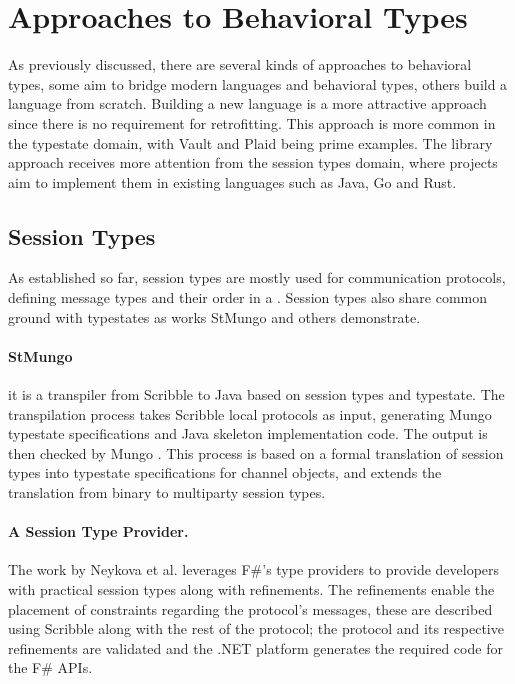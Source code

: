 \section{Approaches to Behavioral Types}\label{sec:behavioral-approaches}

As previously discussed, there are several kinds of approaches to behavioral types,
some aim to bridge modern languages and behavioral types,
others build a language from scratch.
Building a new language is a more attractive approach since there is no requirement for retrofitting.
This approach is more common in the typestate domain, with Vault and Plaid being prime examples.
The library approach receives more attention from the session types domain,
where projects aim to implement them in existing languages such as Java, Go and Rust.

\subsection{Session Types}
As established so far, session types are mostly used for communication protocols,
defining message types and their order in a .
Session types also share common ground with typestates as works StMungo \autocite{Kouzapas2018, Voinea2020}
and others \autocite{Gay2015, Vasconcelos2017} demonstrate.

\paragraph{StMungo} it is a transpiler from Scribble \autocite{Yoshida2014} to Java based on session types and typestate.
The transpilation process takes Scribble local protocols as input, generating Mungo typestate specifications and Java skeleton implementation code.
The output is then checked by Mungo \autocite{Kouzapas2018, Voinea2020}.
This process is based on a formal translation of session types into typestate specifications for channel objects, and
extends the translation from binary to multiparty session types.

\paragraph{A Session Type Provider.}
The work by Neykova et al. \autocite{Neykova2018} leverages F\#'s type providers to provide developers with practical session types along with refinements.
The refinements enable the placement of constraints regarding the protocol's messages,
these are described using Scribble \autocite{Yoshida2014} along with the rest of the protocol;
the protocol and its respective refinements are validated and the .NET platform generates the required code for the F\# \gls{API}s.

